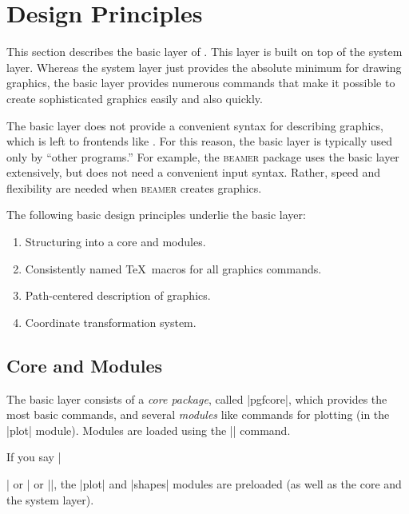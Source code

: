 %
%
%


\section{Design Principles}

This section describes the basic layer of \pgfname. This layer is built on top
of the system layer. Whereas the system layer just provides the absolute
minimum for drawing graphics, the basic layer provides numerous commands that
make it possible to create sophisticated graphics easily and also quickly.

The basic layer does not provide a convenient syntax for describing graphics,
which is left to frontends like \tikzname. For this reason, the basic layer is
typically used only by ``other programs.'' For example, the \textsc{beamer}
package uses the basic layer extensively, but does not need a convenient input
syntax. Rather, speed and flexibility are needed when \textsc{beamer} creates
graphics.

The following basic design principles underlie the basic layer:
%
\begin{enumerate}
    \item Structuring into a core and modules.
    \item Consistently named \TeX\ macros for all graphics commands.
    \item Path-centered description of graphics.
    \item Coordinate transformation system.
\end{enumerate}


\subsection{Core and Modules}

The basic layer consists of a \emph{core package}, called |pgfcore|, which
provides the most basic commands, and several \emph{modules} like commands for
plotting (in the |plot| module). Modules are loaded using the |\usepgfmodule|
command.

If you say |\usepackage{pgf}| or | or |\usemodule[pgf]|, the
|plot| and |shapes| modules are preloaded (as well as the core and the system
layer).


